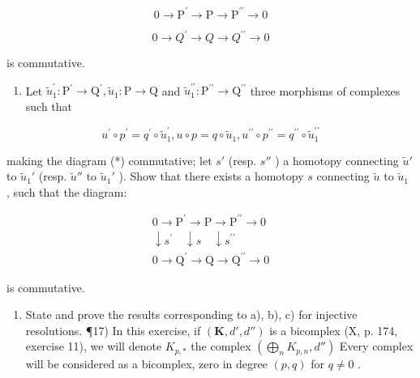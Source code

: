 \[
0 \rightarrow \mathrm{P} ^ {\prime} \rightarrow \mathrm{P} \rightarrow \mathrm{P} ^ {\prime \prime} \rightarrow 0\tag{*}
\]

\[
0 \rightarrow Q ^ {\prime} \rightarrow Q \rightarrow Q ^ {\prime \prime} \rightarrow 0
\]

is commutative.

\begin{enumerate}
\def\labelenumi{\alph{enumi})}
\setcounter{enumi}{2}
\tightlist
\item
  Let \(\tilde{u}_{1}^{\prime}: \mathrm{P}^{\prime} \to \mathrm{Q}^{\prime}, \tilde{u}_{1}: \mathrm{P} \to \mathrm{Q}\) and \(\tilde{u}_{1}^{\prime\prime}: \mathrm{P}^{\prime\prime} \to \mathrm{Q}^{\prime\prime}\) three morphisms of complexes such that
\end{enumerate}

\[
u ^ {\prime} \circ p ^ {\prime} = q ^ {\prime} \circ \tilde {u} _ {1} ^ {\prime}, u \circ p = q \circ \tilde {u} _ {1}, u ^ {\prime \prime} \circ p ^ {\prime \prime} = q ^ {\prime \prime} \circ \tilde {u} _ {1} ^ {\prime \prime}
\]

making the diagram (*) commutative; let \(s'\) (resp. \(s''\) ) a homotopy connecting \(\tilde{u}'\) to \(\tilde{u}_{1}'\) (resp. \(\tilde{u}''\) to \(\tilde{u}_{1}'\) ). Show that there exists a homotopy \(s\) connecting \(\tilde{u}\) to \(\tilde{u}_{1}\) , such that the diagram:

\[
\begin{array}{c}0 \rightarrow \mathrm{P} ^ {\prime} \rightarrow \mathrm{P} \rightarrow \mathrm{P} ^ {\prime \prime} \rightarrow 0\\\downarrow s ^ {\prime} \quad \downarrow s \quad \downarrow s ^ {\prime \prime}\\0 \rightarrow \mathrm{Q} ^ {\prime} \rightarrow \mathrm{Q} \rightarrow \mathrm{Q} ^ {\prime \prime} \rightarrow 0\end{array}
\]

is commutative.

\begin{enumerate}
\def\labelenumi{\alph{enumi})}
\setcounter{enumi}{3}
\tightlist
\item
  State and prove the results corresponding to a), b), c) for injective resolutions. ¶17) In this exercise, if \((\mathbf{K}, d', d'')\) is a bicomplex (X, p. 174, exercise 11), we will denote \(K_{p,*}\) the complex \((\bigoplus_{n} K_{p,n}, d'')\) Every complex will be considered as a bicomplex, zero in degree \((p, q)\) for \(q \neq 0\) .
\end{enumerate}

